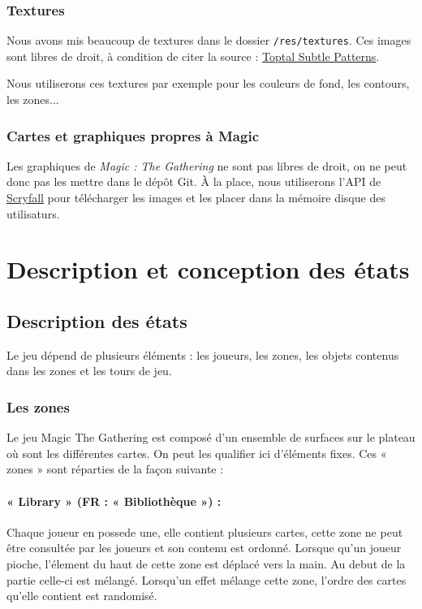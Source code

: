 \documentclass[a4paper,12pt]{article}
\begin{document}
\subsubsection{Textures}

Nous avons mis beaucoup de textures dans le dossier \texttt{/res/textures}.
Ces images sont libres de droit, à condition de citer la source : \href{https://www.toptal.com/designers/subtlepetterns}{Toptal Subtle Patterns}.

Nous utiliserons ces textures par exemple pour les couleurs de fond, les contours, les zones...

\subsubsection{Cartes et graphiques propres à Magic}

Les graphiques de \emph{Magic : The Gathering} ne sont pas libres de droit, on ne peut donc pas les mettre dans le dépôt Git.
À la place, nous utiliserons l'API de \href{https://scryfall.com/}{Scryfall} pour télécharger les images et les placer dans la mémoire disque des utilisaturs.

\clearpage
\section{Description et conception des états}

\subsection{Description des états}

Le jeu dépend de plusieurs éléments : les joueurs, les zones, les objets contenus dans les zones et les tours de jeu. 

\subsubsection{Les zones}

Le jeu Magic The Gathering est composé d’un ensemble de surfaces sur le plateau où sont les différentes cartes. On peut les qualifier ici d’éléments fixes. 
Ces « zones » sont réparties de la façon suivante : 

\paragraph{« Library » (FR : « Bibliothèque ») :} Chaque joueur en possede une, elle contient plusieurs cartes, cette zone ne peut être consultée par les joueurs et son contenu est ordonné.
Lorsque qu'un joueur pioche, l'élement du haut de cette zone est déplacé vers la main.
Au debut de la partie celle-ci est mélangé.
Lorsqu'un effet mélange cette zone, l'ordre des cartes qu'elle contient est randomisé.
\end{document}
